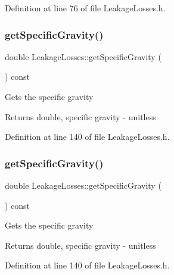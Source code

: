 Definition at line 76 of file Leakage\+Losses.\+h.

\mbox{\label{class_leakage_losses_a37cd8c2282547246bab395424dad51d9}} 
\subsubsection{\texorpdfstring{get\+Specific\+Gravity()}{getSpecificGravity()}\hspace{0.1cm}{\footnotesize\ttfamily [1/3]}}
{\footnotesize\ttfamily double Leakage\+Losses\+::get\+Specific\+Gravity (\begin{DoxyParamCaption}{ }\end{DoxyParamCaption}) const\hspace{0.3cm}{\ttfamily [inline]}}

Gets the specific gravity \begin{DoxyReturn}{Returns}
double, specific gravity -\/ unitless 
\end{DoxyReturn}


Definition at line 140 of file Leakage\+Losses.\+h.

\mbox{\label{class_leakage_losses_a37cd8c2282547246bab395424dad51d9}} 
\subsubsection{\texorpdfstring{get\+Specific\+Gravity()}{getSpecificGravity()}\hspace{0.1cm}{\footnotesize\ttfamily [2/3]}}
{\footnotesize\ttfamily double Leakage\+Losses\+::get\+Specific\+Gravity (\begin{DoxyParamCaption}{ }\end{DoxyParamCaption}) const\hspace{0.3cm}{\ttfamily [inline]}}

Gets the specific gravity \begin{DoxyReturn}{Returns}
double, specific gravity -\/ unitless 
\end{DoxyReturn}


Definition at line 140 of file Leakage\+Losses.\+h.

